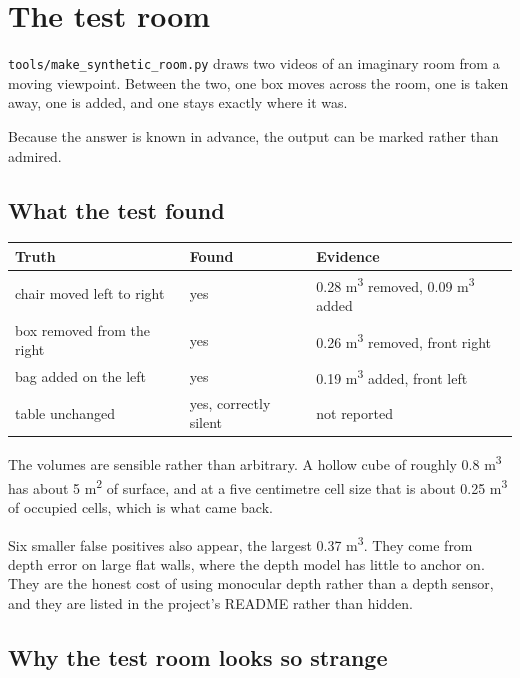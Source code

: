 \chapter{The test room}

\texttt{tools/make\_synthetic\_room.py} draws two videos of an imaginary room from a moving
viewpoint. Between the two, one box moves across the room, one is taken away, one is added, and one
stays exactly where it was.

Because the answer is known in advance, the output can be marked rather than admired.

\section{What the test found}

\begin{center}
\begin{tabular}{@{}p{}p{}p{}@{}}
\toprule
\textbf{Truth} & \textbf{Found} & \textbf{Evidence} \\
\midrule
chair moved left to right & yes & 0.28 m\textsuperscript{3} removed, 0.09 m\textsuperscript{3} added \\[4pt]
box removed from the right & yes & 0.26 m\textsuperscript{3} removed, front right \\[4pt]
bag added on the left & yes & 0.19 m\textsuperscript{3} added, front left \\[4pt]
table unchanged & yes, correctly silent & not reported \\
\bottomrule
\end{tabular}
\end{center}

The volumes are sensible rather than arbitrary. A hollow cube of roughly 0.8 m\textsuperscript{3}
has about 5 m\textsuperscript{2} of surface, and at a five centimetre cell size that is about
0.25 m\textsuperscript{3} of occupied cells, which is what came back.

Six smaller false positives also appear, the largest 0.37 m\textsuperscript{3}. They come from
depth error on large flat walls, where the depth model has little to anchor on. They are the honest
cost of using monocular depth rather than a depth sensor, and they are listed in the project's
README rather than hidden.

\section{Why the test room looks so strange}


